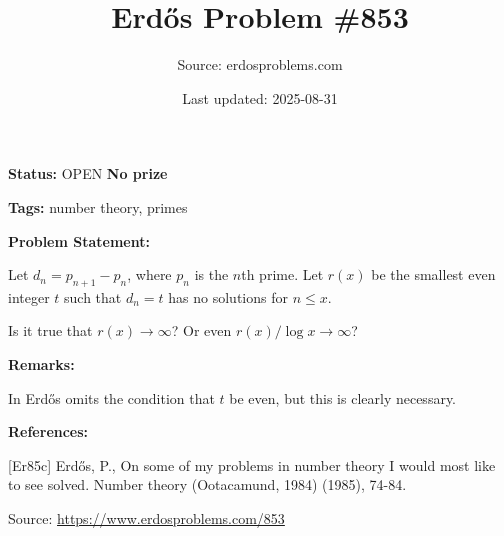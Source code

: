 \documentclass{article}
\title{Erd\H{o}s Problem \#853}
\date{Last updated: 2025-08-31}
\author{Source: erdosproblems.com}
\begin{document}
\maketitle

\noindent\textbf{Status:} OPEN \quad \textbf{No prize}

\noindent\textbf{Tags:} number theory, primes

\medskip
\noindent\textbf{Problem Statement:}

Let $d_n=p_{n+1}-p_n$, where $p_n$ is the $n$th prime. Let $r(x)$ be the smallest even integer $t$ such that $d_n=t$ has no solutions for $n\leq x$.

Is it true that $r(x)\to \infty$? Or even $r(x)/\log x \to \infty$?

\bigskip
\noindent\textbf{Remarks:}

In \cite{Er85c} Erd\H{o}s omits the condition that $t$ be even, but this is clearly necessary.

\bigskip
\noindent\textbf{References:}

[Er85c] Erd\H{o}s, P., On some of my problems in number theory I would most like to see solved. Number theory (Ootacamund, 1984) (1985), 74-84.

\bigskip
\noindent\small{Source: \url{https://www.erdosproblems.com/853}}
\end{document}
